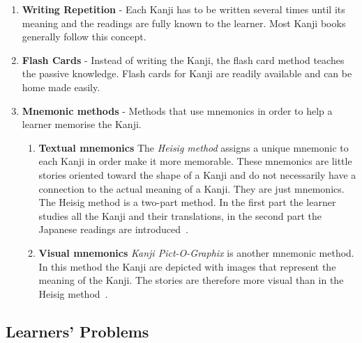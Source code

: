 \begin{enumerate}
  \item \textbf{Writing Repetition} - Each Kanji has to be written several times
        until its meaning and the readings are fully known to the learner.
        Most Kanji books generally follow this concept.

  \item \textbf{Flash Cards} - Instead of writing the Kanji, the flash card 
        method teaches the passive knowledge. Flash cards for Kanji are readily
        available and can be home made easily.

  \item \textbf{Mnemonic methods} - Methods that use mnemonics in order to help
        a learner memorise the Kanji.
        \begin{enumerate}
          \item \textbf{Textual mnemonics} The \emph{Heisig method} assigns a 
                unique mnemonic to each Kanji in order make it more memorable. 
                These mnemonics are little stories oriented toward the shape
                of a Kanji and do not necessarily have a connection to the 
                actual meaning of a Kanji. They are just mnemonics. 
                The Heisig method is a two-part method. In the first part
                the learner studies all the Kanji and their translations, 
                in the second part the Japanese readings are 
                introduced~.

          \item \textbf{Visual mnemonics} \emph{Kanji Pict-O-Graphix} is 
                another mnemonic method. In this method the Kanji are 
                depicted with images that represent the meaning of the Kanji.
                The stories are therefore more visual than in the Heisig 
                method~.
          \end{enumerate}
\end{enumerate}


\subsection{Learners' Problems}
\label{sec:learnersproblems}

